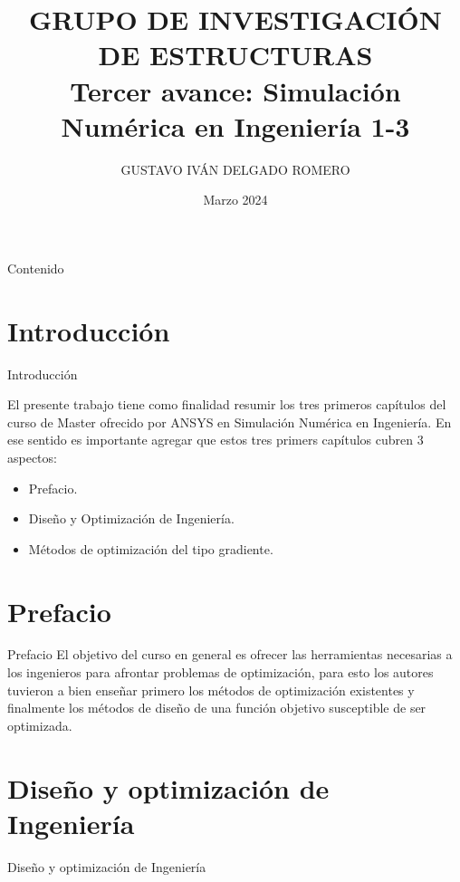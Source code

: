 \documentclass{beamer}
\title[GRUPO DE ESTRUCTURAS]{GRUPO DE INVESTIGACIÓN DE ESTRUCTURAS\\ 
Tercer avance: Simulación Numérica en Ingeniería 1-3}
\author[Gustavo Delgado]{GUSTAVO IVÁN DELGADO ROMERO}
\institute[UNFV-FIC]{
  \inst{}%
  Facultad de Ingeniería Civil\\
  Universidad Nacional Federico Villarreal
}
\date{Marzo 2024}
\begin{document}
\begin{frame}
    \titlepage 
\end{frame}

\begin{frame}{Contenido}
    \tableofcontents[hideallsubsections]
\end{frame}

\section{Introducción}
\begin{frame}{Introducción}
    \justify
    
    El presente trabajo tiene como finalidad resumir los tres primeros capítulos
    del curso de Master ofrecido por ANSYS en Simulación Numérica en Ingeniería.
    En ese sentido es importante agregar que estos tres primers capítulos cubren
    3 aspectos:
    \begin{itemize}
        \item Prefacio.
        \item Diseño y Optimización de Ingeniería.
        \item Métodos de optimización del tipo gradiente.
    \end{itemize}
\end{frame}
\section{Prefacio}
    \begin{frame}{Prefacio}
        El objetivo del curso en general es ofrecer las herramientas necesarias
        a los ingenieros para afrontar problemas de optimización,
        para esto los autores tuvieron a bien enseñar primero los métodos de 
        optimización existentes y finalmente los métodos de diseño de una función
        objetivo susceptible de ser optimizada.
    \end{frame}
\section{Diseño y optimización de Ingeniería}
    \begin{frame}{Diseño y optimización de Ingeniería}
        \tableofcontents[sections={3}]
    \end{frame}
\end{document}

